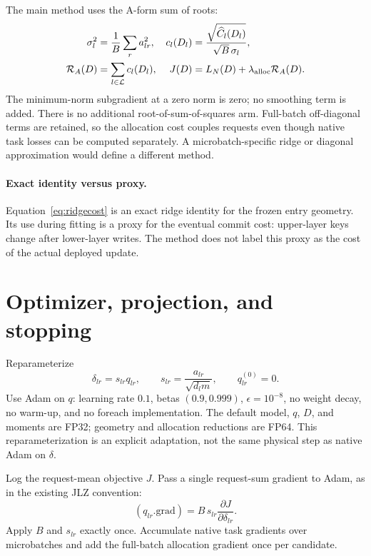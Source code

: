 \documentclass[11pt]{article}
\begin{document}
The main method uses the A-form sum of roots:
\begin{align}
 \sigma_l^2&=\frac1B\sum_r a_{lr}^2,&
 c_l(D_l)&=\frac{\sqrt{\widehat C_l(D_l)}}{\sqrt B\,\sigma_l},\\
 \mathcal R_A(D)&=\sum_{l\in\mathcal L}c_l(D_l),&
 J(D)&=L_N(D)+\lambda_{\rm alloc}\mathcal R_A(D).
 \label{eq:joint}
\end{align}
The minimum-norm subgradient at a zero norm is zero; no smoothing term is added.
There is no additional root-of-sum-of-squares arm. Full-batch off-diagonal terms
are retained, so the allocation cost couples requests even though native task
losses can be computed separately. A microbatch-specific ridge or diagonal
approximation would define a different method.

\paragraph{Exact identity versus proxy.}
Equation~\eqref{eq:ridgecost} is an exact ridge identity for the frozen entry
geometry. Its use during fitting is a proxy for the eventual commit cost:
upper-layer keys change after lower-layer writes. The method does not label
this proxy as the cost of the actual deployed update.

\section{Optimizer, projection, and stopping}
Reparameterize
\begin{equation}
 \delta_{lr}=s_{lr}q_{lr},\qquad
 s_{lr}=\frac{a_{lr}}{\sqrt{d_lm}},\qquad q_{lr}^{(0)}=0.
\end{equation}
Use Adam on $q$: learning rate $0.1$, betas $(0.9,0.999)$,
$\epsilon=10^{-8}$, no weight decay, no warm-up, and no foreach implementation.
The default model, $q$, $D$, and moments are FP32; geometry and allocation
reductions are FP64. This reparameterization is an explicit adaptation, not
the same physical step as native Adam on $\delta$.

Log the request-mean objective $J$. Pass a single request-sum gradient to Adam,
as in the existing JLZ convention:
\begin{equation}
 (q_{lr}.\mathrm{grad})=B\,s_{lr}\frac{\partial J}{\partial\delta_{lr}}.
\end{equation}
Apply $B$ and $s_{lr}$ exactly once. Accumulate native task gradients over
microbatches and add the full-batch allocation gradient once per candidate.
\end{document}
